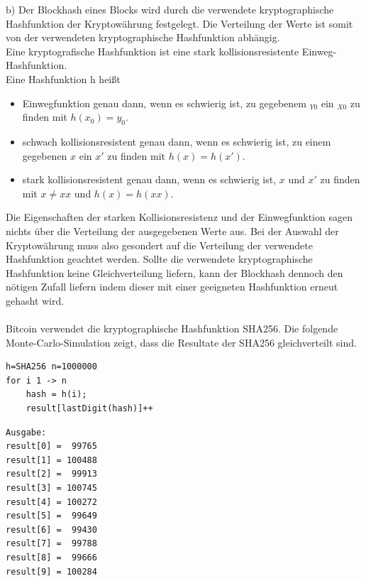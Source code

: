 b) Der Blockhash eines Blocks wird durch die verwendete kryptographische Hashfunktion der Kryptowährung festgelegt. Die Verteilung der Werte ist somit von der verwendeten kryptographische Hashfunktion abhängig.\\
Eine kryptografische Hashfunktion ist eine stark kollisionsresistente Einweg-Hashfunktion.\\
Eine Hashfunktion h heißt
\begin{itemize}
\item Einwegfunktion genau dann, wenn es schwierig ist, zu gegebenem $_{Y0}$ ein $_{X0}$ zu finden mit $h(x_{0}) = y_{0}$.
\item schwach kollisionsresistent genau dann, wenn es schwierig ist, zu einem gegebenen $x$ ein $x'$ zu finden mit $h(x) = h(x')$.
\item stark kollisionsresistent genau dann, wenn es schwierig ist, $x$ und $x'$ zu finden
mit $x \neq xx$ und $h(x) = h(xx)$.
\end{itemize}Die Eigenschaften der starken Kollisionsresistenz und der Einwegfunktion sagen nichts über die Verteilung der ausgegebenen Werte aus. Bei der Auswahl der Kryptowährung muss also gesondert auf die Verteilung der verwendete Hashfunktion geachtet werden. Sollte die verwendete kryptographische Hashfunktion keine Gleichverteilung liefern, kann der Blockhash dennoch den nötigen Zufall liefern indem dieser mit einer geeigneten Hashfunktion erneut gehasht wird.\\\\
Bitcoin verwendet die kryptographische Hashfunktion SHA256.
Die folgende Monte-Carlo-Simulation zeigt, dass die Resultate der SHA256 gleichverteilt sind.
\begin{verbatim}
h=SHA256 n=1000000
for i 1 -> n
    hash = h(i);
    result[lastDigit(hash)]++
\end{verbatim}
\begin{minipage}{0.5\textwidth}
\begin{verbatim}
Ausgabe:
result[0] =  99765
result[1] = 100488
result[2] =  99913
result[3] = 100745
result[4] = 100272
result[5] =  99649
result[6] =  99430
result[7] =  99788
result[8] =  99666
result[9] = 100284
\end{verbatim}
\end{minipage}
